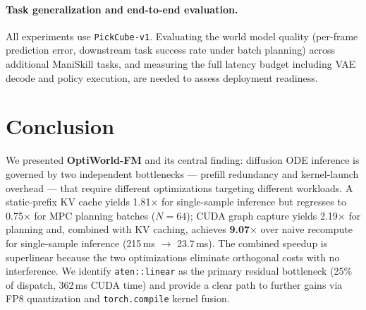 \documentclass[letterpaper,twocolumn,10pt]{article}
\begin{document}
\paragraph{Task generalization and end-to-end evaluation.}
All experiments use \texttt{PickCube-v1}.  Evaluating the world model
quality (per-frame prediction error, downstream task success rate
under batch planning) across additional ManiSkill tasks, and measuring
the full latency budget including VAE decode and policy execution,
are needed to assess deployment readiness.

\section{Conclusion}

We presented \textbf{OptiWorld-FM} and its central finding: diffusion
ODE inference is governed by two independent bottlenecks --- prefill
redundancy and kernel-launch overhead --- that require different
optimizations targeting different workloads.  A static-prefix KV
cache yields 1.81$\times$ for single-sample inference but regresses
to 0.75$\times$ for MPC planning batches
($N{=}64$); CUDA graph capture yields 2.19$\times$ for planning and,
combined with KV caching, achieves \textbf{9.07$\times$} over naive
recompute for single-sample inference (215\,ms $\to$ 23.7\,ms).  The
combined speedup is superlinear because the two optimizations eliminate
orthogonal costs with no interference.  We identify
\texttt{aten::linear} as the primary residual bottleneck (25\% of
dispatch, 362\,ms CUDA time) and provide a clear path to further
gains via FP8 quantization and \texttt{torch.compile} kernel fusion.
\end{document}
